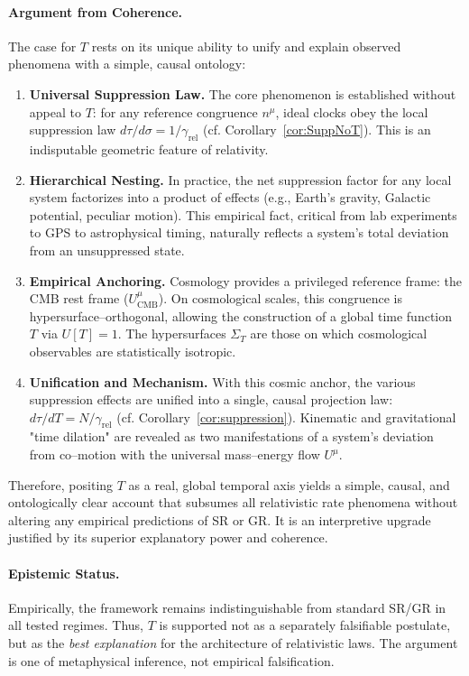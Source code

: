 \documentclass[12pt]{article}
\theoremstyle{plain}
\newcommand{\gammarel}{\gamma_{\!\mathrm{rel}}}
\begin{document}
\paragraph{Argument from Coherence.}
The case for $T$ rests on its unique ability to unify and explain observed phenomena with a simple, causal ontology:
\begin{enumerate}
    \item \textbf{Universal Suppression Law.} The core phenomenon is established without appeal to $T$: for any reference congruence $n^\mu$, ideal clocks obey the local suppression law $d\tau/d\sigma=1/\gammarel$ (cf. Corollary~\ref{cor:SuppNoT}). This is an indisputable geometric feature of relativity.

    \item \textbf{Hierarchical Nesting.} In practice, the net suppression factor for any local system factorizes into a product of effects (e.g., Earth's gravity, Galactic potential, peculiar motion). This empirical fact, critical from lab experiments to GPS to astrophysical timing, naturally reflects a system's total deviation from an unsuppressed state.

    \item \textbf{Empirical Anchoring.} Cosmology provides a privileged reference frame: the CMB rest frame ($U^\mu_{\mathrm{CMB}}$). On cosmological scales, this congruence is hypersurface–orthogonal, allowing the construction of a global time function $T$ via $U[T]=1$. The hypersurfaces $\Sigma_T$ are those on which cosmological observables are statistically isotropic.

    \item \textbf{Unification and Mechanism.} With this cosmic anchor, the various suppression effects are unified into a single, causal projection law: $d\tau/dT=N/\gammarel$ (cf. Corollary~\ref{cor:suppression}). Kinematic and gravitational "time dilation" are revealed as two manifestations of a system's deviation from co–motion with the universal mass–energy flow $U^\mu$.
\end{enumerate}
Therefore, positing $T$ as a real, global temporal axis yields a simple, causal, and ontologically clear account that subsumes all relativistic rate phenomena without altering any empirical predictions of SR or GR. It is an interpretive upgrade justified by its superior explanatory power and coherence.

\paragraph{Epistemic Status.}
Empirically, the framework remains indistinguishable from standard SR/GR in all tested regimes. Thus, $T$ is supported not as a separately falsifiable postulate, but as the \emph{best explanation} for the architecture of relativistic laws. The argument is one of metaphysical inference, not empirical falsification.
\end{document}
